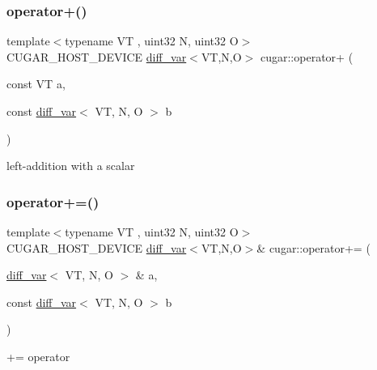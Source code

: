 \subsubsection{\texorpdfstring{operator+()}{operator+()}\hspace{0.1cm}{\footnotesize\ttfamily [3/3]}}
{\footnotesize\ttfamily template$<$typename VT , uint32 N, uint32 O$>$ \\
C\+U\+G\+A\+R\+\_\+\+H\+O\+S\+T\+\_\+\+D\+E\+V\+I\+CE \hyperlink{structcugar_1_1diff__var}{diff\+\_\+var}$<$VT,N,O$>$ cugar\+::operator+ (\begin{DoxyParamCaption}\item[{const VT}]{a,  }\item[{const \hyperlink{structcugar_1_1diff__var}{diff\+\_\+var}$<$ VT, N, O $>$}]{b }\end{DoxyParamCaption})\hspace{0.3cm}{\ttfamily [inline]}}

left-\/addition with a scalar \mbox{\label{group___auto_diff_module_ga93e04de8aa060923d0d031f83643b975}} 
\subsubsection{\texorpdfstring{operator+=()}{operator+=()}}
{\footnotesize\ttfamily template$<$typename VT , uint32 N, uint32 O$>$ \\
C\+U\+G\+A\+R\+\_\+\+H\+O\+S\+T\+\_\+\+D\+E\+V\+I\+CE \hyperlink{structcugar_1_1diff__var}{diff\+\_\+var}$<$VT,N,O$>$\& cugar\+::operator+= (\begin{DoxyParamCaption}\item[{\hyperlink{structcugar_1_1diff__var}{diff\+\_\+var}$<$ VT, N, O $>$ \&}]{a,  }\item[{const \hyperlink{structcugar_1_1diff__var}{diff\+\_\+var}$<$ VT, N, O $>$}]{b }\end{DoxyParamCaption})\hspace{0.3cm}{\ttfamily [inline]}}

+= operator \mbox{\label{group___auto_diff_module_ga9f04070233d92db57d6d4287daf01702}} 

